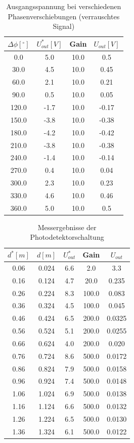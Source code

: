 \documentclass[11pt]{article}
\begin{document}
\begin{table}[h!]
\centering
\begin{tabular}{|c|c|c|c|}
\hline
$\Delta \phi [^\circ]$ & $U_{out}^* [V]$ & Gain & $U_{out} [V]$ \\
\hline
0.0 & 5.0 & 10.0 & 0.5\\
30.0 & 4.5 & 10.0 & 0.45\\
60.0 & 2.1 & 10.0 & 0.21\\
90.0 & 0.5 & 10.0 & 0.05\\
120.0 & -1.7 & 10.0 & -0.17\\
150.0 & -3.8 & 10.0 & -0.38\\
180.0 & -4.2 & 10.0 & -0.42\\
210.0 & -3.8 & 10.0 & -0.38\\
240.0 & -1.4 & 10.0 & -0.14\\
270.0 & 0.4 & 10.0 & 0.04\\
300.0 & 2.3 & 10.0 & 0.23\\
330.0 & 4.6 & 10.0 & 0.46\\
360.0 & 5.0 & 10.0 & 0.5\\
\hline
\end{tabular}
\label{data2}
\caption{Ausgangsspannung bei verschiedenen Phasenverschiebungen \newline (verrauschtes Signal)}
\end{table}


\begin{table}[h!]
\centering
\begin{tabular}{|c|c|c|c|c|}
\hline
$d^* [m]$ & $d [m]$ & $U_{out}^*$ & Gain & $U_{out}$ \\
\hline
0.06 & 0.024 & 6.6 & 2.0 & 3.3\\
0.16 & 0.124 & 4.7 & 20.0 & 0.235\\
0.26 & 0.224 & 8.3 & 100.0 & 0.083\\
0.36 & 0.324 & 4.5 & 100.0 & 0.045\\
0.46 & 0.424 & 6.5 & 200.0 & 0.0325\\
0.56 & 0.524 & 5.1 & 200.0 & 0.0255\\
0.66 & 0.624 & 4.0 & 200.0 & 0.020\\
0.76 & 0.724 & 8.6 & 500.0 & 0.0172\\
0.86 & 0.824 & 7.9 & 500.0 & 0.0158\\
0.96 & 0.924 & 7.4 & 500.0 & 0.0148\\
1.06 & 1.024 & 6.9 & 500.0 & 0.0138\\
1.16 & 1.124 & 6.6 & 500.0 & 0.0132\\
1.26 & 1.224 & 6.5 & 500.0 & 0.0130\\
1.36 & 1.324 & 6.1 & 500.0 & 0.0122\\
\hline
\end{tabular}
\label{data}
\caption{Messergebnisse der Photodetektorschaltung}
\end{table}
\end{document}
